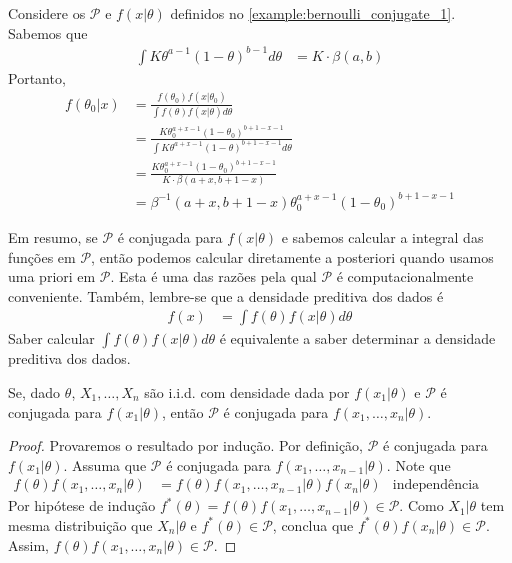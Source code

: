 \begin{example}
 \label{example:bernoulli_conjugate_2}
 Considere os $\mathcal{P}$ e $f(x|\theta)$ definidos
 no \cref{example:bernoulli_conjugate_1}.
 Sabemos que
 \begin{align*}
  \int{K\theta^{a-1}(1-\theta)^{b-1}d\theta}
  &= K \cdot \beta(a,b)
 \end{align*}
 Portanto,
 \begin{align*}
  f(\theta_{0}|x)
  &= \frac{f(\theta_{0})f(x|\theta_{0})}
  {\int{f(\theta)f(x|\theta)d\theta}} \\
  &= \frac{K\theta_{0}^{a+x-1}(1-\theta_{0})^{b+1-x-1}}
  {\int{K\theta^{a+x-1}(1-\theta)^{b+1-x-1}d\theta}} \\
  &= \frac{K\theta_{0}^{a+x-1}(1-\theta_{0})^{b+1-x-1}}
  {K \cdot \beta(a+x,b+1-x)} \\
  &= \beta^{-1}(a+x,b+1-x)\theta_{0}^{a+x-1}
  (1-\theta_{0})^{b+1-x-1}
 \end{align*}
\end{example}

Em resumo, se $\mathcal{P}$ é conjugada para
$f(x|\theta)$ e sabemos calcular a integral das
funções em $\mathcal{P}$, então podemos calcular
diretamente a posteriori quando usamos uma
priori em $\mathcal{P}$.
Esta é uma das razões pela qual $\mathcal{P}$ é
computacionalmente conveniente.
Também, lembre-se que a densidade preditiva dos dados é
\begin{align*}
 f(x) &= \int{f(\theta)f(x|\theta)d\theta}
\end{align*}
Saber calcular $\int{f(\theta)f(x|\theta)d\theta}$ é
equivalente a saber determinar a
densidade preditiva dos dados.

\begin{lemma}
 Se, dado $\theta$, $X_{1},\ldots,X_{n}$ são i.i.d.
 com densidade 
 dada por $f(x_{1}|\theta)$ e
 $\mathcal{P}$ é conjugada para $f(x_{1}|\theta)$,
 então $\mathcal{P}$ é conjugada para
 $f(x_{1},\ldots,x_{n}|\theta)$.
\end{lemma}

\begin{proof}
 Provaremos o resultado por indução.
 Por definição, $\mathcal{P}$ é conjugada para
 $f(x_{1}|\theta)$.
 Assuma que $\mathcal{P}$ é conjugada para
 $f(x_{1},\ldots,x_{n-1}|\theta)$.
 Note que
 \begin{align*}
  f(\theta) f(x_{1},\ldots,x_{n}|\theta)
  &=f(\theta)f(x_{1},\ldots,x_{n-1}|\theta)
  f(x_{n}|\theta)
  & \text{independência condicional}
 \end{align*}
 Por hipótese de indução $f^{*}(\theta) = f(\theta)f(x_{1},\ldots,x_{n-1}|\theta) \in \mathcal{P}$.
 Como $X_{1}|\theta$ tem mesma distribuição que
 $X_{n}|\theta$ e $f^{*}(\theta) \in \mathcal{P}$,
 conclua que $f^{*}(\theta)f(x_{n}|\theta) \in \mathcal{P}$.
 Assim, $f(\theta) f(x_{1},\ldots,x_{n}|\theta) \in \mathcal{P}$.
\end{proof}

